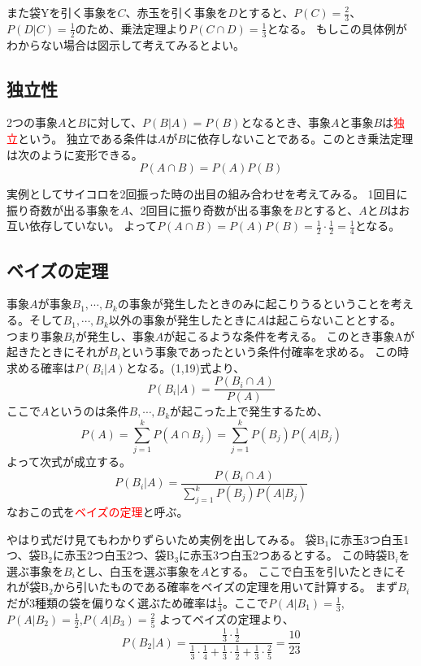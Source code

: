 \documentclass[a4paper,10pt]{jarticle}
\begin{document}
また袋Yを引く事象を$C$、赤玉を引く事象を$D$とすると、$P(C)=\frac{2}{3}$、$P(D|C)=\frac{1}{2}$のため、乗法定理より$P(C\cap D)=\frac{1}{3}$となる。
もしこの具体例がわからない場合は図示して考えてみるとよい。

\subsection{独立性}
2つの事象$A$と$B$に対して、$P(B|A)=P(B)$となるとき、事象$A$と事象$B$は\textcolor{red}{独立}という。
独立である条件は$A$が$B$に依存しないことである。このとき乗法定理は次のように変形できる。
\begin{equation}
    P(A\cap B) = P(A)P(B)\tag{1,21}
\end{equation}

実例としてサイコロを2回振った時の出目の組み合わせを考えてみる。
1回目に振り奇数が出る事象を$A$、2回目に振り奇数が出る事象を$B$とすると、$A$と$B$はお互い依存していない。
よって$P(A\cap B)= P(A)P(B)=\frac{1}{2}\cdot\frac{1}{2}=\frac{1}{4}$となる。
\subsection{ベイズの定理}
事象$A$が事象$B_1,\cdots,B_k$の事象が発生したときのみに起こりうるということを考える。そして$B_1,\cdots,B_k$以外の事象が発生したときに$A$は起こらないこととする。
つまり事象$B_i$が発生し、事象$A$が起こるような条件を考える。
このとき事象Aが起きたときにそれが$B_i$という事象であったという条件付確率を求める。
この時求める確率は$P(B_i|A)$となる。(1,19)式より、
\begin{equation}
    P(B_i|A) = \frac{P(B_i\cap A)}{P(A)}\tag{1,22}
\end{equation}
ここで$A$というのは条件$B,\cdots,B_k$が起こった上で発生するため、
\begin{equation}
    P(A) =\sum^k_{j=1}P(A\cap B_j)=\sum^k_{j=1}P(B_j)P(A|B_j)\tag{1,23}
\end{equation}
よって次式が成立する。
\begin{equation}
    P(B_i|A) = \frac{P(B_i\cap A)}{\sum^k_{j=1}P(B_j)P(A|B_j)}\tag{1,23}
\end{equation}
なおこの式を\textcolor{red}{ベイズの定理}と呼ぶ。

やはり式だけ見てもわかりずらいため実例を出してみる。
袋B$_1$に赤玉3つ白玉1つ、袋B$_2$に赤玉2つ白玉2つ、袋B$_3$に赤玉3つ白玉2つあるとする。
この時袋B$_i$を選ぶ事象を$B_i$とし、白玉を選ぶ事象を$A$とする。
ここで白玉を引いたときにそれが袋B$_2$から引いたものである確率をベイズの定理を用いて計算する。
まず$B_i$だが3種類の袋を偏りなく選ぶため確率は$\frac{1}{3}$。ここで$P(A|B_1)=\frac{1}{3}$,$P(A|B_2)=\frac{1}{2}$,$P(A|B_3)=\frac{2}{5}$
よってベイズの定理より、
\begin{equation}
    P(B_2|A)=\frac{\frac{1}{3}\cdot\frac{1}{2}}{\frac{1}{3}\cdot\frac{1}{4}+\frac{1}{3}\cdot\frac{1}{2}+\frac{1}{3}\cdot\frac{2}{5}}=\frac{10}{23}\tag{1,24}
\end{equation}
\end{document}

